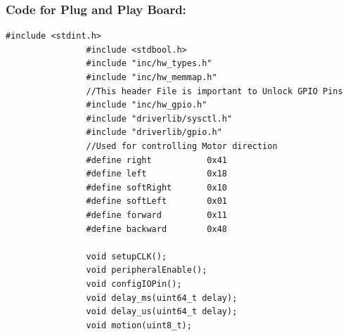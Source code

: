 \documentclass[a4paper,10pt,oneside]{article}
\begin{document}
			\subsubsection{\textbf{Code for Plug and Play Board:}}
			\begin{lstlisting}[style=CStyle]
				#include <stdint.h>
				#include <stdbool.h>
				#include "inc/hw_types.h"
				#include "inc/hw_memmap.h"
				//This header File is important to Unlock GPIO Pins
				#include "inc/hw_gpio.h"
				#include "driverlib/sysctl.h"
				#include "driverlib/gpio.h"
				//Used for controlling Motor direction
				#define right           0x41
				#define left            0x18
				#define softRight       0x10
				#define softLeft        0x01
				#define forward         0x11
				#define backward        0x48
				
				void setupCLK();
				void peripheralEnable();
				void configIOPin();
				void delay_ms(uint64_t delay);
				void delay_us(uint64_t delay);
				void motion(uint8_t);
				

\end{lstlisting}
\end{document}
